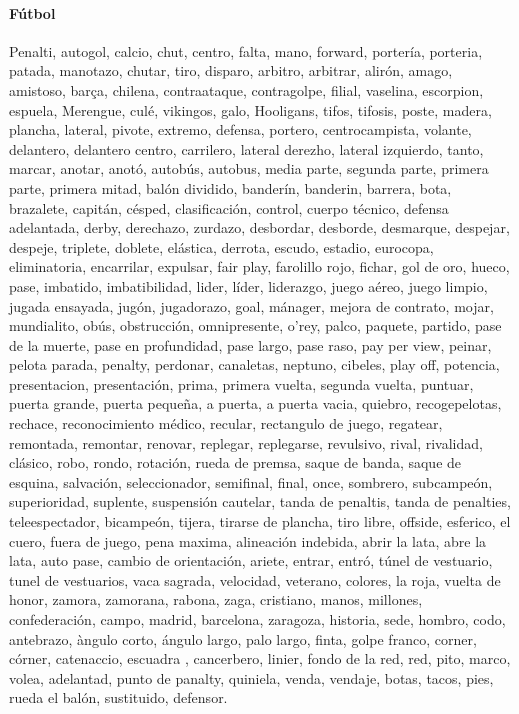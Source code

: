 \documentclass[../all.tex]{subfiles}
\begin{document}
    \paragraph{Fútbol}
    Penalti, autogol, calcio, chut, centro, falta, mano, forward, portería, porteria, patada, manotazo, chutar, tiro, disparo, arbitro, arbitrar, alirón, amago, amistoso, barça, chilena, contraataque, contragolpe, filial, vaselina, escorpion, espuela, Merengue, culé, vikingos, galo, Hooligans, tifos, tifosis, poste, madera, plancha, lateral, pivote, extremo, defensa, portero, centrocampista, volante, delantero, delantero centro, carrilero, lateral derezho, lateral izquierdo, tanto, marcar, anotar, anotó, autobús, autobus, media parte, segunda parte, primera parte, primera mitad, balón dividido, banderín, banderin, barrera, bota, brazalete, capitán, césped, clasificación, control, cuerpo técnico, defensa adelantada, derby, derechazo, zurdazo, desbordar, desborde, desmarque, despejar, despeje, triplete, doblete, elástica, derrota, escudo, estadio, eurocopa, eliminatoria, encarrilar, expulsar, fair play, farolillo rojo, fichar, gol de oro, hueco, pase, imbatido, imbatibilidad, lider, líder, liderazgo, juego aéreo, juego limpio, jugada ensayada, jugón, jugadorazo, goal, mánager, mejora de contrato, mojar, mundialito, obús, obstrucción, omnipresente, o'rey, palco, paquete, partido, pase de la muerte, pase en profundidad, pase largo, pase raso, pay per view, peinar, pelota parada, penalty, perdonar, canaletas, neptuno, cibeles, play off, potencia, presentacion, presentación, prima, primera vuelta, segunda vuelta, puntuar, puerta grande, puerta pequeña, a puerta, a puerta vacia, quiebro, recogepelotas, rechace, reconocimiento médico, recular, rectangulo de juego, regatear, remontada, remontar, renovar, replegar, replegarse, revulsivo, rival, rivalidad, clásico, robo, rondo, rotación, rueda de premsa, saque de banda, saque de esquina, salvación, seleccionador, semifinal, final, once, sombrero, subcampeón, superioridad, suplente, suspensión cautelar, tanda de penaltis, tanda de penalties, teleespectador, bicampeón, tijera, tirarse de plancha, tiro libre, offside, esferico, el cuero, fuera de juego, pena maxima, alineación indebida, abrir la lata, abre la lata, auto pase, cambio de orientación, ariete, entrar, entró, túnel de vestuario, tunel de vestuarios, vaca sagrada, velocidad, veterano, colores, la roja, vuelta de honor, zamora, zamorana, rabona, zaga, cristiano, manos, millones, confederación, campo, madrid, barcelona, zaragoza, historia, sede, hombro, codo, antebrazo, àngulo corto, ángulo largo, palo largo, finta, golpe franco, corner, córner, catenaccio, escuadra
, cancerbero, linier, fondo de la red, red, pito, marco, volea, adelantad, punto de panalty, quiniela, venda, vendaje, botas, tacos, pies, rueda el balón, sustituido, defensor.
\end{document}
